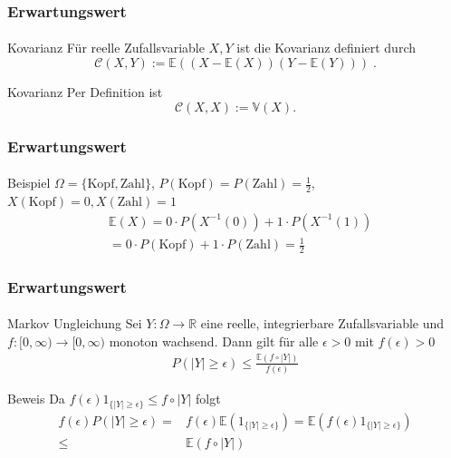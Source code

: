 \documentclass{beamer}
\begin{document}
 \begin{frame}
    \frametitle{Erwartungswert}
\framesubtitle{}
\begin{block}{Kovarianz}
Für  reelle Zufallsvariable $X,Y$ ist die Kovarianz definiert durch
$$ \mathcal{C} (X,Y) :=  \mathbb{E}( (X - \mathbb{E}(X)) (Y - \mathbb{E}(Y))) \; .$$
\end{block}

\begin{block}{Kovarianz}
    Per Definition ist
    $$ \mathcal{C} (X,X) :=  \mathbb{V}(X).$$
    \end{block}
 \end{frame}





\begin{frame}
    \frametitle{Erwartungswert}
\framesubtitle{}
\begin{block}{Beispiel}
$\Omega = \{ \text{Kopf},\text{Zahl}\}$, $P(\text{Kopf}) = P(\text{Zahl}) = \frac{1}{2}$, $X(\text{Kopf}) = 0,  X(\text{Zahl}) = 1$ 
\begin{align*}
& \mathbb{E}(X)  = 0 \cdot P(X^{-1}(0) ) + 1 \cdot P(X^{-1}(1)) \\
& =0  \cdot P(\text{Kopf}) + 1 \cdot P(\text{Zahl}) = \frac{1}{2}  
\end{align*}
\end{block}
 \end{frame}



\begin{frame}
    \frametitle{Erwartungswert}
\framesubtitle{}
\begin{block}{Markov Ungleichung}
Sei $Y : \Omega \to \mathbb{R}$  eine  reelle, integrierbare  Zufallsvariable und $f : [0, \infty) \to [0, \infty)$ monoton wachsend.
Dann gilt für alle $\epsilon > 0$ mit $f(\epsilon) > 0$
\begin{align*}
P (|Y |  \geq \epsilon) \leq \frac{\mathbb{E} (f \circ |Y|)}{f(\epsilon)}
\end{align*}
\end{block}
\begin{block}{Beweis}
Da $f(\epsilon) 1_{\{ |Y| \geq  \epsilon \} } \leq f \circ |Y|$ folgt
\begin{align*}
f(\epsilon) P(|Y| \geq \epsilon) = & f(\epsilon) \mathbb{E}(1_{\{ |Y| \geq  \epsilon \} }) = \mathbb{E}( f(\epsilon) 1_{\{ |Y| \geq  \epsilon \} }) \\
\leq & \mathbb{E}( f \circ |Y|)
\end{align*}
\end{block}
 \end{frame}
\end{document}
